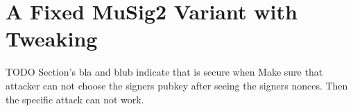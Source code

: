 \documentclass[a4paper,orivec,oribibl,english]{llncs}
\begin{document}
\section{A Fixed MuSig2 Variant with Tweaking}
TODO
Section's bla and blub indicate that is secure when
Make sure that attacker can not choose the signers pubkey after seeing the signers nonces.
Then the specific attack can not work.

\begin{figure}
 \begin{tcolorbox}[boxsep=-1mm]
  \begin{pchstack}[center]
   \begin{pcvstack}
    \pcvspace
    \pcvspace
    \pcvspace
    \pcvspace
    \pcvspace
    \pcvspace
\end{pcvstack}
\end{pchstack}
\end{tcolorbox}
\end{figure}
\end{document}
